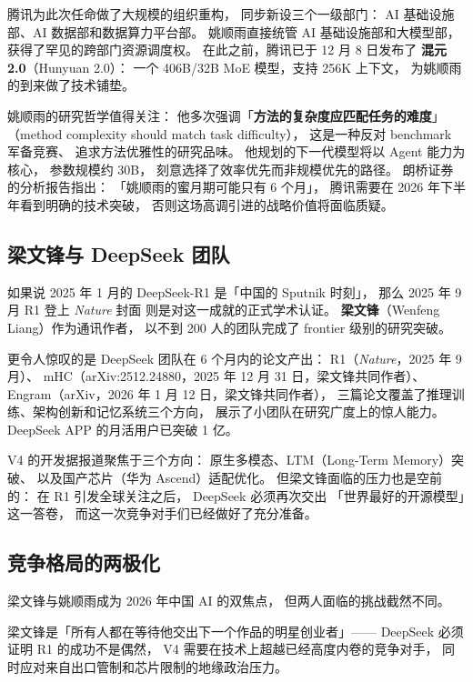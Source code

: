 腾讯为此次任命做了大规模的组织重构，
同步新设三个一级部门：
AI 基础设施部、AI 数据部和数据算力平台部。
姚顺雨直接统管 AI 基础设施部和大模型部，
获得了罕见的跨部门资源调度权。
在此之前，腾讯已于 12 月 8 日发布了
\textbf{混元 2.0}（Hunyuan 2.0）：
一个 406B/32B MoE 模型，支持 256K 上下文，
为姚顺雨的到来做了技术铺垫。

姚顺雨的研究哲学值得关注：
他多次强调「\textbf{方法的复杂度应匹配任务的难度}」
（method complexity should match task difficulty），
这是一种反对 benchmark 军备竞赛、
追求方法优雅性的研究品味。
他规划的下一代模型将以 Agent 能力为核心，
参数规模约 30B，
刻意选择了效率优先而非规模优先的路径。
朗桥证券的分析报告指出：
「姚顺雨的蜜月期可能只有 6 个月」，
腾讯需要在 2026 年下半年看到明确的技术突破，
否则这场高调引进的战略价值将面临质疑。

\subsection{梁文锋与 DeepSeek 团队}

如果说 2025 年 1 月的 DeepSeek-R1 是「中国的 Sputnik 时刻」，
那么 2025 年 9 月 R1 登上 \textit{Nature} 封面
则是对这一成就的正式学术认证。
\textbf{梁文锋}（Wenfeng Liang）作为通讯作者，
以不到 200 人的团队完成了 frontier 级别的研究突破。

更令人惊叹的是 DeepSeek 团队在 6 个月内的论文产出：
R1（\textit{Nature}，2025 年 9 月）、
mHC（arXiv:2512.24880，2025 年 12 月 31 日，梁文锋共同作者）、
Engram（arXiv，2026 年 1 月 12 日，梁文锋共同作者），
三篇论文覆盖了推理训练、架构创新和记忆系统三个方向，
展示了小团队在研究广度上的惊人能力。
DeepSeek APP 的月活用户已突破 1 亿。

V4 的开发据报道聚焦于三个方向：
原生多模态、LTM（Long-Term Memory）突破、
以及国产芯片（华为 Ascend）适配优化。
但梁文锋面临的压力也是空前的：
在 R1 引发全球关注之后，
DeepSeek 必须再次交出
「世界最好的开源模型」这一答卷，
而这一次竞争对手们已经做好了充分准备。

\subsection{竞争格局的两极化}

梁文锋与姚顺雨成为 2026 年中国 AI 的双焦点，
但两人面临的挑战截然不同。

梁文锋是「所有人都在等待他交出下一个作品的明星创业者」——
DeepSeek 必须证明 R1 的成功不是偶然，
V4 需要在技术上超越已经高度内卷的竞争对手，
同时应对来自出口管制和芯片限制的地缘政治压力。

